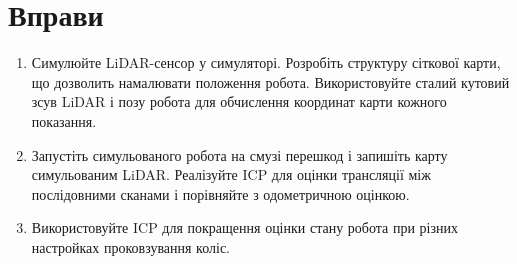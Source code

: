 \section*{Вправи}
\begin{enumerate}
\item Симулюйте LiDAR-сенсор у симуляторі. Розробіть структуру сіткової карти, що дозволить намалювати положення робота. Використовуйте сталий кутовий зсув LiDAR і позу робота для обчислення координат карти кожного показання.
\item Запустіть симульованого робота на смузі перешкод і запишіть карту симульованим LiDAR. Реалізуйте ICP для оцінки трансляції між послідовними сканами і порівняйте з одометричною оцінкою.
\item Використовуйте ICP для покращення оцінки стану робота при різних настройках проковзування коліс.
\end{enumerate}
